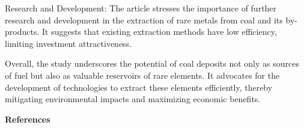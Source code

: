 \begin{multicols}{2}
Research and Development: The article stresses the importance of further
research and development in the extraction of rare metals from coal and
its by-products. It suggests that existing extraction methods have low
efficiency, limiting investment attractiveness.

Overall, the study underscores the potential of coal deposits not only
as sources of fuel but also as valuable reservoirs of rare elements. It
advocates for the development of technologies to extract these elements
efficiently, thereby mitigating environmental impacts and maximizing
economic benefits.
\end{multicols}

\begin{center}
{\bfseries References}
\end{center}

